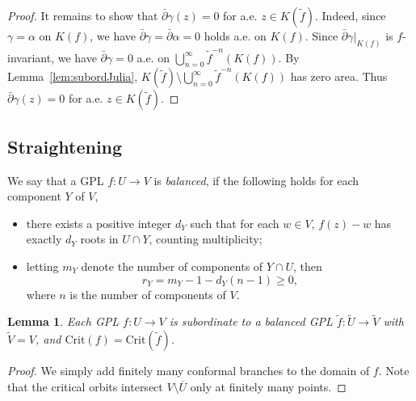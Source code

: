 \documentclass{amsart}
\numberwithin{equation}{section}
\newtheorem{lemma}[theorem]{Lemma}%
\theoremstyle{definition}
\theoremstyle{remark}
\begin{document}
\begin{proof}
It remains to show that $\bar{\partial} \gamma(z)=0$ for a.e. $z\in K(\widetilde{f})$. Indeed, since $\gamma=\alpha$ on $K(f)$, we have $\bar{\partial} \gamma=\bar{\partial}\alpha=0$ holds a.e. on $K(f)$. Since $\bar{\partial}\gamma |_{K(f)}$ is $f$-invariant, we have 
$\bar{\partial}\gamma =0$ a.e. on $\bigcup_{n=0}^\infty \widetilde{f}^{-n}(K(f))$. 
By Lemma~\ref{lem:subordJulia}, $K(\widetilde{f})\setminus \bigcup_{n=0}^\infty \widetilde{f}^{-n}(K(f))$ has zero area. Thus  $\bar{\partial} \gamma(z)=0$ for a.e. $z\in K(\widetilde{f})$.
\end{proof}

\subsection{Straightening}\label{subsec:straighten}
We say that a GPL $f:U\to V$ is {\em balanced}, if the following holds for each component $Y$ of $V$,
\begin{itemize}
\item there exists a positive integer $d_{Y}$ such that for each $w\in V$, $f(z)-w$ has exactly $d_Y$ roots in $U\cap Y$, counting multiplicity; 
\item letting $m_Y$ denote the number of components of $Y\cap U$, then 
\begin{equation}\label{eqn:RH}
r_Y=m_Y-1- d_Y(n-1)
\ge 0,
\end{equation}
where $n$ is the number of components of $V$.
\end{itemize}

\begin{lemma}\label{lem:subbal}
Each GPL $f:U\to V$ is subordinate to a balanced GPL $\widetilde{f}: \widetilde{U}\to \widetilde{V}$ with $\widetilde{V}=V$, and $\text{Crit}(f)=\text{Crit}(\widetilde{f})$. 
\end{lemma}
\begin{proof} We simply add finitely many conformal branches to the domain of $f$. Note that the critical orbits intersect $V\setminus \overline{U}$ only at finitely many points. 
\end{proof}
\end{document}
